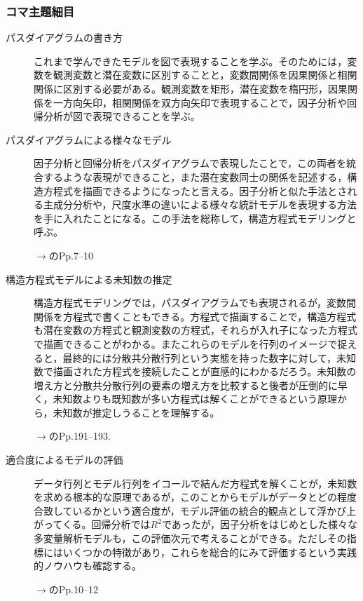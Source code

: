\subsubsection{コマ主題細目}
\begin{description}
    \item[パスダイアグラムの書き方] これまで学んできたモデルを図で表現することを学ぶ。そのためには，変数を観測変数と潜在変数に区別することと，変数間関係を因果関係と相関関係に区別する必要がある。観測変数を矩形，潜在変数を楕円形，因果関係を一方向矢印，相関関係を双方向矢印で表現することで，因子分析や回帰分析が図で表現できることを学ぶ。

    \item[パスダイアグラムによる様々なモデル] 因子分析と回帰分析をパスダイアグラムで表現したことで，この両者を統合するような表現ができること，また潜在変数同士の関係を記述する，構造方程式を描画できるようになったと言える。因子分析と似た手法とされる主成分分析や，尺度水準の違いによる様々な統計モデルを表現する方法を手に入れたことになる。この手法を総称して，構造方程式モデリングと呼ぶ。

    \begin{flushright}
        $\to$\citet{小杉考司2014-01-10}のPp.7--10
    \end{flushright}


    \item[構造方程式モデルによる未知数の推定] 構造方程式モデリングでは，パスダイアグラムでも表現されるが，変数間関係を方程式で書くこともできる。方程式で描画することで，構造方程式も潜在変数の方程式と観測変数の方程式，それらが入れ子になった方程式で描画できることがわかる。またこれらのモデルを行列のイメージで捉えると，最終的には分散共分散行列という実態を持った数字に対して，未知数で描画された方程式を接続したことが直感的にわかるだろう。未知数の増え方と分散共分散行列の要素の増え方を比較すると後者が圧倒的に早く，未知数よりも既知数が多い方程式は解くことができるという原理から，未知数が推定しうることを理解する。

    \begin{flushright}
        $\to$\citet{kosugi2018}のPp.191--193.
    \end{flushright}

    \item[適合度によるモデルの評価]  データ行列とモデル行列をイコールで結んだ方程式を解くことが，未知数を求める根本的な原理であるが，このことからモデルがデータとどの程度合致しているかという適合度が，モデル評価の統合的観点として浮かび上がってくる。回帰分析では$R^2$であったが，因子分析をはじめとした様々な多変量解析モデルも，この評価次元で考えることができる。ただしその指標にはいくつかの特徴があり，これらを総合的にみて評価するという実践的ノウハウも確認する。


    \begin{flushright}
        $\to$\citet{小杉考司2014-01-10}のPp.10--12
    \end{flushright}


\end{description}
